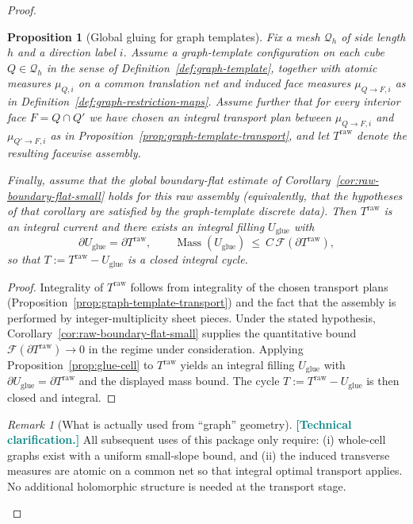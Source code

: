 \documentclass[11pt]{article}
\newcommand{\REVMZ}[1]{\textcolor{teal}{#1}}  %
\numberwithin{equation}{section}  %
\theoremstyle{plain}
\newtheorem{proposition}[theorem]{Proposition}
\theoremstyle{definition}
\theoremstyle{remark}
\newtheorem{remark}[theorem]{Remark}
\DeclareMathOperator{\Mass}{Mass}
\begin{document}
\begin{proof}
%
\begin{proposition}[Global gluing for graph templates]\label{prop:graph-template-global}
Fix a mesh $\mathcal Q_h$ of side length $h$ and a direction label $i$.
Assume a graph-template configuration on each cube $Q\in\mathcal Q_h$ in the sense of Definition~\ref{def:graph-template},
together with atomic measures $\mu_{Q,i}$ on a common translation net and induced face measures $\mu_{Q\to F,i}$
as in Definition~\ref{def:graph-restriction-maps}.
Assume further that for every interior face $F=Q\cap Q'$ we have chosen an \emph{integral} transport plan between
$\mu_{Q\to F,i}$ and $\mu_{Q'\to F,i}$ as in Proposition~\ref{prop:graph-template-transport}, and let
$T^{\mathrm{raw}}$ denote the resulting facewise assembly.

Finally, assume that the global boundary-flat estimate of Corollary~\ref{cor:raw-boundary-flat-small}
holds for this raw assembly (equivalently, that the hypotheses of that corollary are satisfied by the graph-template discrete data).
Then $T^{\mathrm{raw}}$ is an integral current and there exists an integral filling $U_{\mathrm{glue}}$ with
\[
\partial U_{\mathrm{glue}}=\partial T^{\mathrm{raw}},
\qquad
\Mass(U_{\mathrm{glue}})\ \le\ C\,\mathcal F(\partial T^{\mathrm{raw}}),
\]
so that $T:=T^{\mathrm{raw}}-U_{\mathrm{glue}}$ is a closed integral cycle.
\end{proposition}

\begin{proof}
Integrality of $T^{\mathrm{raw}}$ follows from integrality of the chosen transport plans (Proposition~\ref{prop:graph-template-transport})
and the fact that the assembly is performed by integer-multiplicity sheet pieces.
Under the stated hypothesis, Corollary~\ref{cor:raw-boundary-flat-small} supplies the quantitative bound
$\mathcal F(\partial T^{\mathrm{raw}})\to 0$ in the regime under consideration.
Applying Proposition~\ref{prop:glue-cell} to $T^{\mathrm{raw}}$ yields an integral filling $U_{\mathrm{glue}}$ with
$\partial U_{\mathrm{glue}}=\partial T^{\mathrm{raw}}$ and the displayed mass bound.
The cycle $T:=T^{\mathrm{raw}}-U_{\mathrm{glue}}$ is then closed and integral.
\end{proof}


%
\begin{remark}[What is actually used from ``graph'' geometry]\label{rem:graph-flat-remark}
\REVMZ{\textbf{[Technical clarification.]}}
All subsequent uses of this package only require: (i) whole-cell graphs exist with a uniform small-slope bound, and
(ii) the induced transverse measures are atomic on a common net so that integral optimal transport applies.
No additional holomorphic structure is needed at the transport stage.
\end{remark}



\end{proof}
\end{document}
